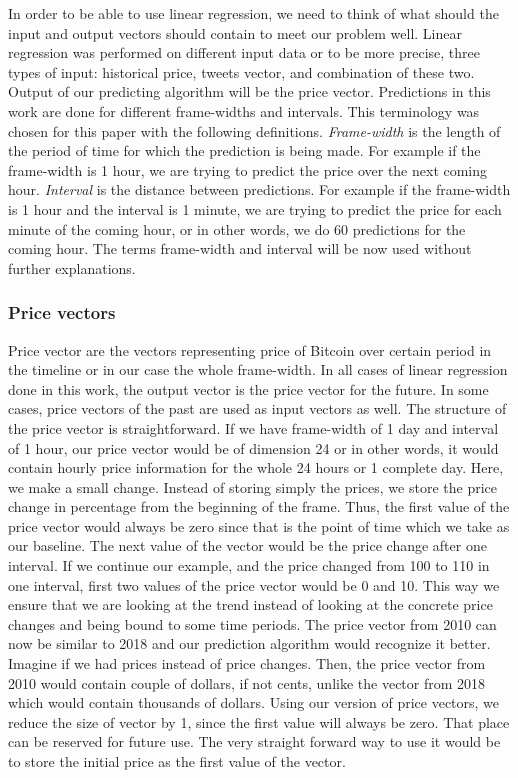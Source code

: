 \documentclass[a4paper,11pt,oneside]{article}
\begin{document}
  In order to be able to use linear regression, we need to think of what should the input and output vectors should contain to meet our problem well. Linear regression was performed on different input data or to be more precise, three types of input: historical price, tweets vector, and combination of these two. Output of our predicting algorithm will be the price vector. Predictions in this work are done for different frame-widths and intervals. This terminology was chosen for this paper with the following definitions. {\it Frame-width} is the length of the period of time for which the prediction is being made. For example if the frame-width is 1 hour, we are trying to predict the price over the next coming hour. {\it Interval} is the distance between predictions. For example if the frame-width is 1 hour and the interval is 1 minute, we are trying to predict the price for each minute of the coming hour, or in other words, we do 60 predictions for the coming hour. The terms frame-width and interval will be now used without further explanations. 
  
  \subsubsection{Price vectors}\label{pricevectors}
  
  Price vector are the vectors representing price of Bitcoin over certain period in the timeline or in our case the whole frame-width. In all cases of linear regression done in this work, the output vector is the price vector for the future. In some cases, price vectors of the past are used as input vectors as well. The structure of the price vector is straightforward. If we have frame-width of 1 day and interval of 1 hour, our price vector would be of dimension 24 or in other words, it would contain hourly price information for the whole 24 hours or 1 complete day. Here, we make a small change. Instead of storing simply the prices, we store the price change in percentage from the beginning of the frame. Thus, the first value of the price vector would always be zero since that is the point of time which we take as our baseline. The next value of the vector would be the price change after one interval. If we continue our example, and the price changed from 100 to 110 in one interval, first two values of the price vector would be 0 and 10. This way we ensure that we are looking at the trend instead of looking at the concrete price changes and being bound to some time periods. The price vector from 2010 can now be similar to 2018 and our prediction algorithm would recognize it better. Imagine if we had prices instead of price changes. Then, the price vector from 2010 would contain couple of dollars, if not cents, unlike the vector from 2018 which would contain thousands of dollars. Using our version of price vectors, we reduce the size of vector by 1, since the first value will always be zero. That place can be reserved for future use. The very straight forward way to use it would be to store the initial price as the first value of the vector.
  
\end{document}
